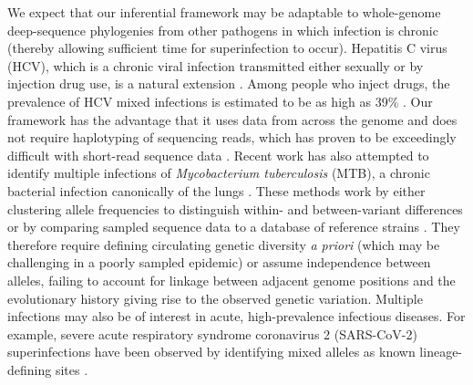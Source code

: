 \documentclass[10pt,letterpaper]{article}
\begin{document}
We expect that our inferential framework may be adaptable to whole-genome deep-sequence phylogenies from other pathogens in which infection is chronic (thereby allowing sufficient time for superinfection to occur). Hepatitis C virus (HCV), which is a chronic viral infection transmitted either sexually or by injection drug use, is a natural extension \cite{cunningham2015}. Among people who inject drugs, the prevalence of HCV mixed infections is estimated to be as high as 39\% \cite{van_de_laar2009}. Our framework has the advantage that it uses data from across the genome and does not require haplotyping of sequencing reads, which has proven to be exceedingly difficult with short-read sequence data \cite{eliseev2020}. Recent work has also attempted to identify multiple infections of \textit{Mycobacterium tuberculosis} (MTB), a chronic bacterial infection canonically of the lungs \cite{cohen2012}. These methods work by either clustering allele frequencies to distinguish within- and between-variant differences \cite{sobkowiak2018,gabbassov2021,sobkowiak2024} or by comparing sampled sequence data to a database of reference strains \cite{anyansi2020}. They therefore require defining circulating genetic diversity \textit{a priori} (which may be challenging in a poorly sampled epidemic) or assume independence between alleles, failing to account for linkage between adjacent genome positions and the evolutionary history giving rise to the observed genetic variation. Multiple infections may also be of interest in acute, high-prevalence infectious diseases. For example, severe acute respiratory syndrome coronavirus 2 (SARS-CoV-2) superinfections have been observed by identifying mixed alleles as known lineage-defining sites \cite{dezordi2022,wertheim2022}. \par
\end{document}
